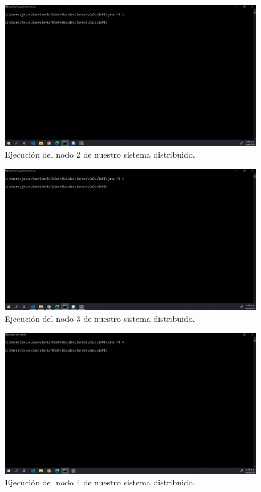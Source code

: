 \documentclass[11pt]{article}
\begin{document}
		\begin{figure}[H]
			\centering
			\includegraphics[scale=0.34]{resources/nodo2.png}
			\caption{Ejecución del nodo 2 de nuestro sistema distribuido. }\label{fig:picture}
		\end{figure}
		\begin{figure}[H]
			\centering
			\includegraphics[scale=0.34]{resources/nodo3.png}
			\caption{Ejecución del nodo 3 de nuestro sistema distribuido. }\label{fig:picture}
		\end{figure}
		\begin{figure}[H]
			\centering
			\includegraphics[scale=0.34]{resources/nodo4.png}
			\caption{Ejecución del nodo 4 de nuestro sistema distribuido. }\label{fig:picture}
		\end{figure}
\end{document}
